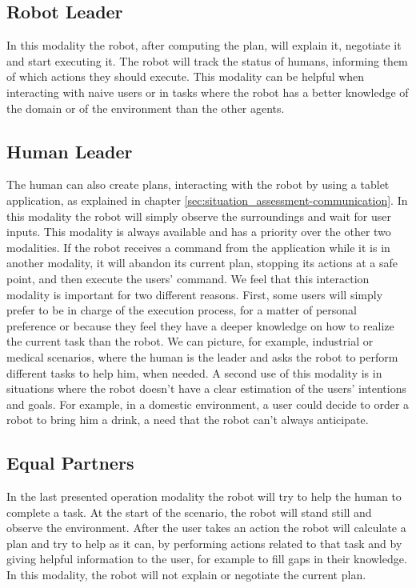 \subsection{Robot Leader}
In this modality the robot, after computing the plan, will explain it, negotiate it and start executing it.
The robot will track the status of humans, informing them of which actions they should execute. This modality can be helpful when interacting with  naive users or in tasks where the robot has a better knowledge of the
domain or of the environment than the other agents.

\subsection{Human Leader}
The human can also create plans, interacting with the robot by using a
tablet application, as explained in chapter \ref{sec:situation_assessment-communication}. In this modality the robot   will simply observe the surroundings and wait for user inputs. This modality is always available and has a priority over
the other two modalities. If the robot receives a command from the
application while it is in another modality, it will abandon its current
plan, stopping its actions at a safe point, and then execute the users'
command. We feel that this interaction modality is important for two
different reasons.  First, some users will simply prefer to be in
charge of the execution process, for a matter of personal preference or because they
feel they have a deeper knowledge on how to realize the current task
than the robot. We can picture, for example, industrial or medical
scenarios, where the human is the leader and asks the robot to perform
different tasks to help him, when needed. A second use of this modality is in situations where
the robot doesn't have  a clear estimation of the users' intentions and
goals. For example, in a domestic environment, a user could decide to
order a robot to bring him a drink, a need that the robot can't always anticipate.

\subsection{Equal Partners}
In the last presented operation modality the robot will try to help
the human to complete a task. At the start of the scenario, the robot
will stand still and observe the environment. After the user takes an
action the robot will calculate a plan and try to help as it can, by
performing actions related to that task and by giving helpful information to
the user, for example to fill gaps in their knowledge. In this modality, 
the robot will not explain or negotiate the current plan.

